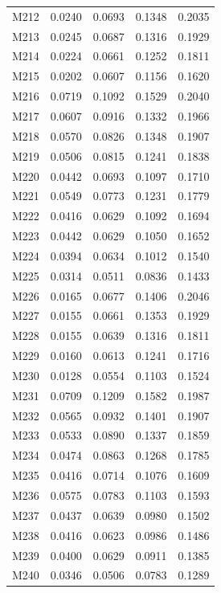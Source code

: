 \begin{longtable}{lrrrr}
M212 & 0.0240 & 0.0693 & 0.1348 & 0.2035 \\
M213 & 0.0245 & 0.0687 & 0.1316 & 0.1929 \\
M214 & 0.0224 & 0.0661 & 0.1252 & 0.1811 \\
M215 & 0.0202 & 0.0607 & 0.1156 & 0.1620 \\
M216 & 0.0719 & 0.1092 & 0.1529 & 0.2040 \\
M217 & 0.0607 & 0.0916 & 0.1332 & 0.1966 \\
M218 & 0.0570 & 0.0826 & 0.1348 & 0.1907 \\
M219 & 0.0506 & 0.0815 & 0.1241 & 0.1838 \\
M220 & 0.0442 & 0.0693 & 0.1097 & 0.1710 \\
M221 & 0.0549 & 0.0773 & 0.1231 & 0.1779 \\
M222 & 0.0416 & 0.0629 & 0.1092 & 0.1694 \\
M223 & 0.0442 & 0.0629 & 0.1050 & 0.1652 \\
M224 & 0.0394 & 0.0634 & 0.1012 & 0.1540 \\
M225 & 0.0314 & 0.0511 & 0.0836 & 0.1433 \\
M226 & 0.0165 & 0.0677 & 0.1406 & 0.2046 \\
M227 & 0.0155 & 0.0661 & 0.1353 & 0.1929 \\
M228 & 0.0155 & 0.0639 & 0.1316 & 0.1811 \\
M229 & 0.0160 & 0.0613 & 0.1241 & 0.1716 \\
M230 & 0.0128 & 0.0554 & 0.1103 & 0.1524 \\
M231 & 0.0709 & 0.1209 & 0.1582 & 0.1987 \\
M232 & 0.0565 & 0.0932 & 0.1401 & 0.1907 \\
M233 & 0.0533 & 0.0890 & 0.1337 & 0.1859 \\
M234 & 0.0474 & 0.0863 & 0.1268 & 0.1785 \\
M235 & 0.0416 & 0.0714 & 0.1076 & 0.1609 \\
M236 & 0.0575 & 0.0783 & 0.1103 & 0.1593 \\
M237 & 0.0437 & 0.0639 & 0.0980 & 0.1502 \\
M238 & 0.0416 & 0.0623 & 0.0986 & 0.1486 \\
M239 & 0.0400 & 0.0629 & 0.0911 & 0.1385 \\
M240 & 0.0346 & 0.0506 & 0.0783 & 0.1289 \\
\end{longtable}

